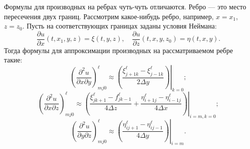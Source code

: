 \documentclass[a4paper]{article}
\begin{document}
Формулы для производных на ребрах чуть-чуть отличаются. Ребро --- это место пересечения двух границ. Рассмотрим какое-нибудь ребро, например, $x = x_1$, $z = z_0$. Пусть на соответствующих границах заданы условия Неймана:
\begin{equation*}
\frac{\partial u}{\partial x}(t,x_1,y,z) = \xi(t,y,z), \quad \frac{\partial u}{\partial z}(t,x,y,z_0) = \eta(t,x,y).
\end{equation*}
Тогда формулы для аппроксимации производных на рассматриваемом ребре такие:
\begin{equation*}
\left(\frac{\partial^2 u}{\partial x\partial y}\right)^{\ell}_{mj0} \approx \left.\left(\frac{\xi^{\ell}_{j+1k} - \xi^{\ell}_{j-1k}}{2\Delta y}\right)\right|_{ k = 0};
\end{equation*}
\begin{equation*}
\left(\frac{\partial^2 u}{\partial x\partial z}\right)^{\ell}_{mj0} \approx \left.\left(\frac{\xi^{\ell}_{jk+1} - f^{\ell}_{jk-1}}{4\Delta z} + \frac{\eta^{\ell}_{i+1j} - \eta^{\ell}_{i-1j}}{4\Delta x}\right)\right|_{i = m, k = 0};
\end{equation*}
\begin{equation*}
\left(\frac{\partial^2 u}{\partial y\partial z}\right)^{\ell}_{mj0} \approx \left.\left(\frac{\eta^{\ell}_{ij+1} - \eta^{\ell}_{ij-1}}{4\Delta y}\right)\right|_{i = m}.
\end{equation*}
\end{document}
